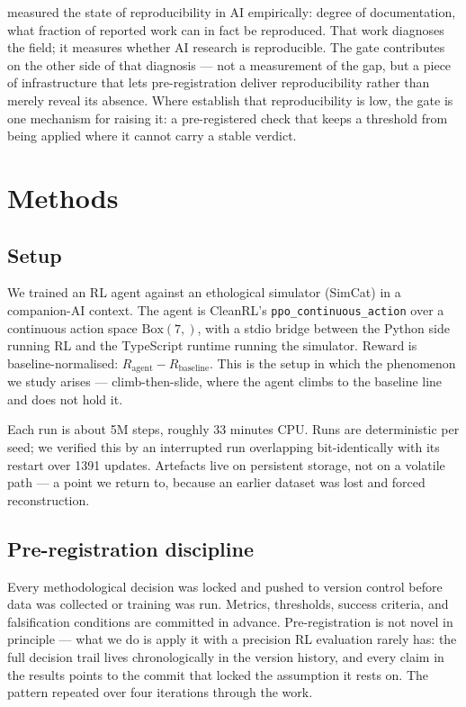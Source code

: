 \documentclass{article}
\newcommand{\code}[1]{\texttt{#1}}
\begin{document}
\citet{gundersen2018state} measured the state of reproducibility in AI
empirically: degree of documentation, what fraction of reported work can in fact
be reproduced. That work diagnoses the field; it measures whether AI research is
reproducible. The gate contributes on the other side of that diagnosis --- not a
measurement of the gap, but a piece of infrastructure that lets pre-registration
deliver reproducibility rather than merely reveal its absence. Where
\citet{gundersen2018state} establish that reproducibility is low, the gate is
one mechanism for raising it: a pre-registered check that keeps a threshold from
being applied where it cannot carry a stable verdict.

\section{Methods}

\subsection{Setup}
\label{sec:2.1}

We trained an RL agent against an ethological simulator (SimCat) in a companion-AI context. The agent is CleanRL's \code{ppo\_continuous\_action} over a continuous action space $\mathrm{Box}(7,)$, with a stdio bridge between the Python side running RL and the TypeScript runtime running the simulator. Reward is baseline-normalised: $R_\mathrm{agent} - R_\mathrm{baseline}$. This is the setup in which the phenomenon we study arises --- climb-then-slide, where the agent climbs to the baseline line and does not hold it.

Each run is about 5M steps, roughly 33 minutes CPU. Runs are deterministic per seed; we verified this by an interrupted run overlapping bit-identically with its restart over 1391 updates. Artefacts live on persistent storage, not on a volatile path --- a point we return to, because an earlier dataset was lost and forced reconstruction.

\subsection{Pre-registration discipline}
\label{sec:2.2}

Every methodological decision was locked and pushed to version control before data was collected or training was run. Metrics, thresholds, success criteria, and falsification conditions are committed in advance. Pre-registration is not novel in principle --- what we do is apply it with a precision RL evaluation rarely has: the full decision trail lives chronologically in the version history, and every claim in the results points to the commit that locked the assumption it rests on. The pattern repeated over four iterations through the work.
\end{document}

